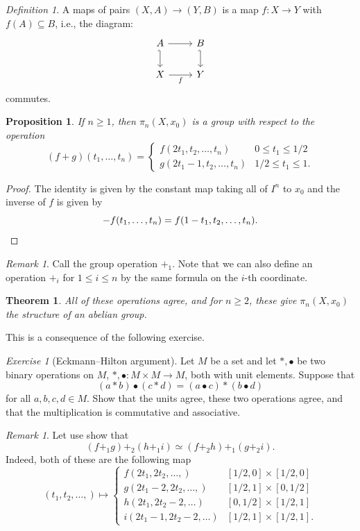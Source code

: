 \documentclass[a4paper]{tufte-book}
\newtheorem{Thm}[equation]{Theorem}
\newtheorem{Prop}[equation]{Proposition}
\theoremstyle{remark}
\newtheorem{Def}[equation]{Definition}
\newtheorem{Ex}[equation]{Exercise}
\newtheorem{Rem}[equation]{Remark}
\begin{document}
\begin{Def}
	A maps of pairs $(X,A) \to (Y,B)$ is a map $f \colon X \to Y$ with $f(A) \subseteq B$, i.e., the diagram:
\[\begin{tikzcd}
	A & B \\
	X & Y
	\arrow[from=1-1, to=1-2]
	\arrow["f"', from=2-1, to=2-2]
	\arrow[hook', from=1-1, to=2-1]
	\arrow[hook', from=1-2, to=2-2]
\end{tikzcd}\]
	commutes. 
\end{Def}
\begin{Prop}
	If $n \ge 1$, then $\pi_n(X,x_0)$ is a group with respect to the operation
	\[
(f+g)(t_1,\ldots,t_n) = \begin{cases}
	f(2t_1,t_2,\ldots,t_n) & 0 \le t_1 \le 1/2 \\
	g(2t_1-1,t_2,\ldots,t_n) & 1/2 \le t_1 \le 1. 
\end{cases}
	\]
\end{Prop}
\begin{proof}
	The identity is given by the constant map taking all of $I^n$ to $x_0$ and the inverse of $f$ is given by 
	\[
-f(t_1,\ldots,t_n) = f(1-t_1,t_2,\ldots,t_n). \qedhere
	\]
\end{proof}
\begin{Rem}
	Call the group operation $+_1$. Note that we can also define an operation $+_i$ for $1 \le i \le n$ by the same formula on the $i$-th coordinate. 
\end{Rem}
\begin{Thm}
	All of these operations agree, and for $n \ge 2$, these give $\pi_n(X,x_0)$ the structure of an abelian group. 
\end{Thm}
This is a consequence of the following exercise. 
\begin{Ex}[Eckmann--Hilton argument]
	Let $M$ be a set and let $\ast,\bullet$ be two binary operations on $M$, $\ast,\bullet \colon M \times M \to M$, both with unit elements. Suppose that 
	\[
(a \ast b) \bullet (c \ast d) = (a \bullet c) \ast (b \bullet d)
	\]
	for all $a,b,c,d \in M$. Show that the units agree, these two operations agree, and that the multiplication is commutative and associative. 
\end{Ex}
\begin{Rem}
	Let use show that 
	\[
(f+_1 g) +_2 (h+_1 i) \simeq (f+_2 h) +_1 (g+_2 i). 
	\]
	Indeed, both of these are the following map
	\[
(t_1,t_2,\ldots,) \mapsto \begin{cases}
	f(2t_1,2t_2,\ldots,) &[1/2,0] \times [1/2,0]\\
	g(2t_1-2,2t_2,\ldots,) & [1/2,1] \times [0,1/2]\\
h(2t_1,2t_2-2,\ldots) & [0,1/2] \times [1/2,1]\\
i(2t_1-1,2t_2-2,\ldots) & [1/2,1] \times [1/2,1].
\end{cases}
	\]
\end{Rem}
\end{document}

